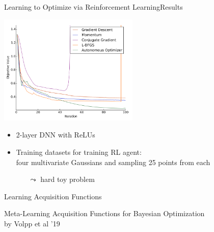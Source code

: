 \begin{frame}[c]{Learning to Optimize via Reinforcement Learning\newline Results }

\centering
\includegraphics[width=0.5\textwidth]{images/l2o_dnn}

\begin{itemize}
\item 2-layer DNN with ReLUs
\item Training datasets for training RL agent:\\ four multivariate Gaussians and sampling 25 points from each
\begin{itemize}
\item[$\leadsto$] hard toy problem
\end{itemize}
\end{itemize}

\end{frame}
\begin{frame}[c, fragile]{Learning Acquisition Functions }

\centering\huge
Meta-Learning Acquisition Functions for Bayesian Optimization\\
by Volpp et al '19

\end{frame}
